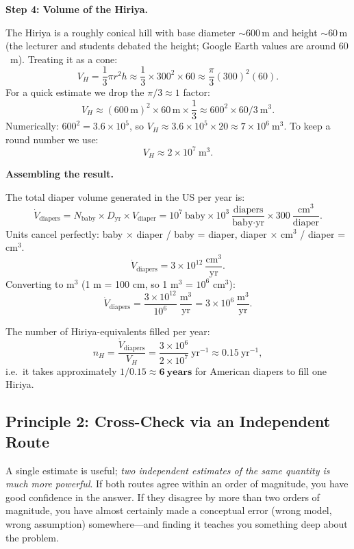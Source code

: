 {\medskip
\textbf{Step 4: Volume of the Hiriya.}

The Hiriya is a roughly conical hill with base diameter $\sim 600\,\text{m}$ and height $\sim 60\,\text{m}$ (the lecturer and students debated the height; Google Earth values are around $60$~m). Treating it as a cone:
\[
  V_H = \frac{1}{3}\pi r^2 h \approx \frac{1}{3}\times 300^2\times 60 \approx \frac{\pi}{3}(300)^2(60).
\]
For a quick estimate we drop the $\pi/3 \approx 1$ factor:
\[
  V_H \approx (600\,\text{m})^2 \times 60\,\text{m} \times \frac{1}{3}
       \approx 600^2 \times 60 / 3\ \text{m}^3.
\]
Numerically: $600^2 = 3.6\times10^5$, so $V_H \approx 3.6\times10^5\times 20 \approx 7\times10^{6}\ \text{m}^3$. To keep a round number we use:
\[
  \boxed{V_H \approx 2\times10^{7}\ \text{m}^3.}
\]

\medskip
\textbf{Assembling the result.}

The total diaper volume generated in the US per year is:
\[
  \dot{V}_\text{diapers} = N_\text{baby}\times D_\text{yr}\times V_\text{diaper}
  = 10^7\ \text{baby}
    \times 10^3\ \frac{\text{diapers}}{\text{baby}\cdot\text{yr}}
    \times 300\ \frac{\text{cm}^3}{\text{diaper}}.
\]
Units cancel perfectly: baby $\times$ diaper / baby = diaper, diaper $\times$ cm$^3$ / diaper = cm$^3$.
\[
  \dot{V}_\text{diapers} = 3\times10^{12}\ \frac{\text{cm}^3}{\text{yr}}.
\]
Converting to m$^3$ (1 m = 100 cm, so 1 m$^3$ = $10^6$ cm$^3$):
\[
  \dot{V}_\text{diapers} = \frac{3\times10^{12}}{10^6}\ \frac{\text{m}^3}{\text{yr}} = 3\times10^6\ \frac{\text{m}^3}{\text{yr}}.
\]

The number of Hiriya-equivalents filled per year:
\[
  \boxed{n_H = \frac{\dot{V}_\text{diapers}}{V_H} = \frac{3\times10^6}{2\times10^7}\ \text{yr}^{-1} \approx 0.15\ \text{yr}^{-1},}
\]
i.e.\ it takes approximately $1/0.15 \approx \mathbf{6\ \text{years}}$ for American diapers to fill one Hiriya.}

\subsection{Principle 2: Cross-Check via an Independent Route}

A single estimate is useful; \emph{two independent estimates of the same quantity is much more powerful}. If both routes agree within an order of magnitude, you have good confidence in the answer. If they disagree by more than two orders of magnitude, you have almost certainly made a conceptual error (wrong model, wrong assumption) somewhere---and finding it teaches you something deep about the problem.

